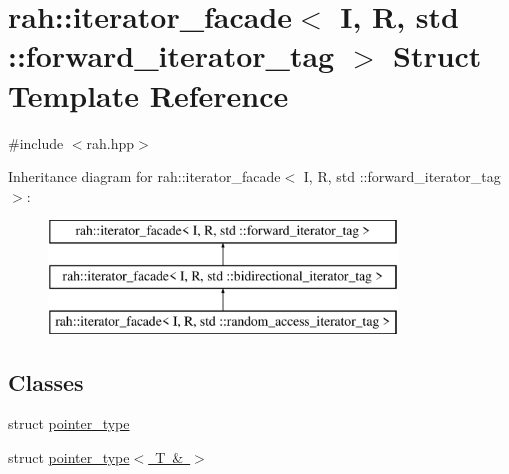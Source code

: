 \hypertarget{structrah_1_1iterator__facade_3_01_i_00_01_r_00_01std_01_1_1forward__iterator__tag_01_4}{}\section{rah\+::iterator\+\_\+facade$<$ I, R, std \+::forward\+\_\+iterator\+\_\+tag $>$ Struct Template Reference}
\label{structrah_1_1iterator__facade_3_01_i_00_01_r_00_01std_01_1_1forward__iterator__tag_01_4}


{\ttfamily \#include $<$rah.\+hpp$>$}

Inheritance diagram for rah\+::iterator\+\_\+facade$<$ I, R, std \+::forward\+\_\+iterator\+\_\+tag $>$\+:\begin{figure}[H]
\begin{center}
\leavevmode
\includegraphics[height=3.000000cm]{structrah_1_1iterator__facade_3_01_i_00_01_r_00_01std_01_1_1forward__iterator__tag_01_4}
\end{center}
\end{figure}
\subsection*{Classes}
\begin{DoxyCompactItemize}
\item 
struct \mbox{\hyperlink{structrah_1_1iterator__facade_3_01_i_00_01_r_00_01std_01_1_1forward__iterator__tag_01_4_1_1pointer__type}{pointer\+\_\+type}}
\item 
struct \mbox{\hyperlink{structrah_1_1iterator__facade_3_01_i_00_01_r_00_01std_01_1_1forward__iterator__tag_01_4_1_1pointer__type_3_01_t_01_6_01_4}{pointer\+\_\+type$<$ T \& $>$}}
\end{DoxyCompactItemize}
